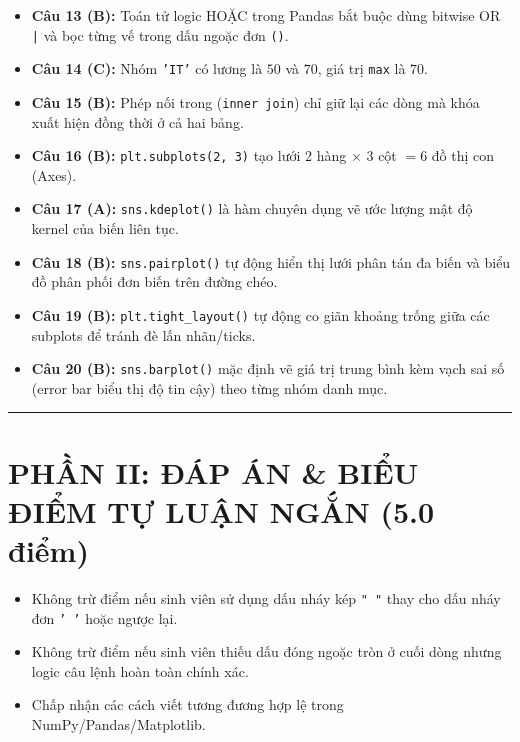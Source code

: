 \documentclass[11pt,a4paper]{article}
\begin{document}
\begin{itemize}[leftmargin=*,itemsep=1.5pt]
  \item \textbf{Câu 13 (B):} Toán tử logic HOẶC trong Pandas bắt buộc dùng bitwise OR \texttt{|} và bọc từng vế trong dấu ngoặc đơn \texttt{()}.
  \item \textbf{Câu 14 (C):} Nhóm \texttt{'IT'} có lương là $50$ và $70$, giá trị \texttt{max} là $70$.
  \item \textbf{Câu 15 (B):} Phép nối trong (\texttt{inner join}) chỉ giữ lại các dòng mà khóa xuất hiện đồng thời ở cả hai bảng.
  \item \textbf{Câu 16 (B):} \texttt{plt.subplots(2, 3)} tạo lưới 2 hàng $\times$ 3 cột $= 6$ đồ thị con (Axes).
  \item \textbf{Câu 17 (A):} \texttt{sns.kdeplot()} là hàm chuyên dụng vẽ ước lượng mật độ kernel của biến liên tục.
  \item \textbf{Câu 18 (B):} \texttt{sns.pairplot()} tự động hiển thị lưới phân tán đa biến và biểu đồ phân phối đơn biến trên đường chéo.
  \item \textbf{Câu 19 (B):} \texttt{plt.tight\_layout()} tự động co giãn khoảng trống giữa các subplots để tránh đè lấn nhãn/ticks.
  \item \textbf{Câu 20 (B):} \texttt{sns.barplot()} mặc định vẽ giá trị trung bình kèm vạch sai số (error bar biểu thị độ tin cậy) theo từng nhóm danh mục.
\end{itemize}

\vspace{3mm}
\hrule
\vspace{2mm}

\section*{PHẦN II: ĐÁP ÁN \& BIỂU ĐIỂM TỰ LUẬN NGẮN (5.0 điểm)}

\begin{tcolorbox}[colback=gray!5!white,colframe=gray!60!black,title=\textbf{Lưu ý chung dành cho Cán bộ chấm thi}]
\small
\begin{itemize}[leftmargin=*,itemsep=1pt]
  \item Không trừ điểm nếu sinh viên sử dụng dấu nháy kép \texttt{" "} thay cho dấu nháy đơn \texttt{' '} hoặc ngược lại.
  \item Không trừ điểm nếu sinh viên thiếu dấu đóng ngoặc tròn ở cuối dòng nhưng logic câu lệnh hoàn toàn chính xác.
  \item Chấp nhận các cách viết tương đương hợp lệ trong NumPy/Pandas/Matplotlib.
\end{itemize}
\end{tcolorbox}
\end{document}
